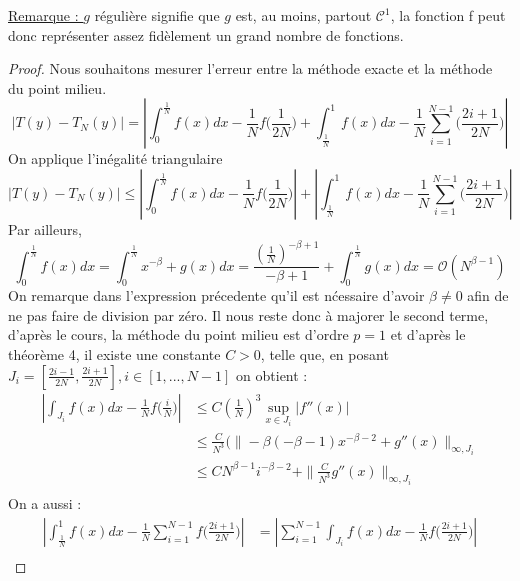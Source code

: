 \documentclass[a4paper,10pt]{article}
\begin{document}
\underline{Remarque : } $g$ r\'eguli\`ere signifie que $g$ est, au moins, partout $\mathcal{C}^1$, la fonction f peut donc repr\'esenter assez fid\`element un grand nombre de fonctions.
\begin{proof}
 Nous souhaitons mesurer l'erreur entre la m\'ethode exacte et la m\'ethode du point milieu.
 \begin{equation}
  |T(y) - T_N(y)| = |\int_0^\frac{1}{N}f(x)dx - \frac{1}{N}f\Big(\frac{1}{2N}\Big) + \int_\frac{1}{N}^1f(x)dx - \frac{1}{N}\sum_{i=1}^{N-1}\Big(\frac{2i + 1}{2N}\Big)|
 \end{equation}
 On applique l'in\'egalit\'e triangulaire
 \begin{equation}
  |T(y) - T_N(y)| \leq |\int_0^\frac{1}{N}f(x)dx - \frac{1}{N}f\Big(\frac{1}{2N}\Big)| + |\int_\frac{1}{N}^1f(x)dx - \frac{1}{N}\sum_{i=1}^{N-1}\Big(\frac{2i + 1}{2N}\Big)|
 \end{equation}
Par ailleurs,
\begin{equation}
\label{firstpart}
 \int_0^{\frac{1}{N}}f(x)dx = \int_0^{\frac{1}{N}} x^{-\beta} + g(x)dx = \frac{(\frac{1}{N})^{-\beta + 1}}{-\beta + 1} + \int_0^{\frac{1}{N}}g(x)dx = \mathcal{O}(N^{\beta - 1})
\end{equation}
On remarque dans l'expression pr\'ecedente qu'il est n\'cessaire d'avoir $\beta \neq 0$ afin de ne pas faire de division par z\'ero.
Il nous reste donc \`a majorer le second terme, d'apr\`es le cours, la m\'ethode du point milieu est d'ordre $p = 1$ et d'apr\`es le th\'eor\`eme 4, il existe une constante $ C > 0$, telle que,
en posant $J_i = [\frac{2i-1}{2N},\frac{2i+1}{2N}], i \in [ 1,..., N-1]$ on obtient :
\begin{equation}
\begin{align}
 |\int_{J_i} f(x)dx - \frac{1}{N}f\Big(\frac{i}{N}\Big)| &\leq C(\frac{1}{N})^3 \sup_{x \in J_i}|f''(x)|\\
						 &\leq \frac{C}{N^3}(\| -\beta(-\beta - 1)x^{-\beta - 2} + g''(x)  \|_{\infty, J_i} \\
						 &\leq C N^{\beta - 1}i^{-\beta - 2} + \|\frac{C}{N^3}g''(x)  \|_{\infty, J_i} \\
\end{align}
\end{equation}
On a aussi :
\begin{equation}
 \begin{align} 
 |\int_\frac{1}{N}^1f(x)dx - \frac{1}{N}\sum_{i=1}^{N-1}f\Big(\frac{2i + 1}{2N}\Big)| &=  |\sum_{i=1}^{N-1}\int_{J_i} f(x)dx - \frac{1}{N}f\Big(\frac{2i + 1}{2N}\Big)|\\

\end{align}
\end{equation}
\end{proof}
\end{document}
